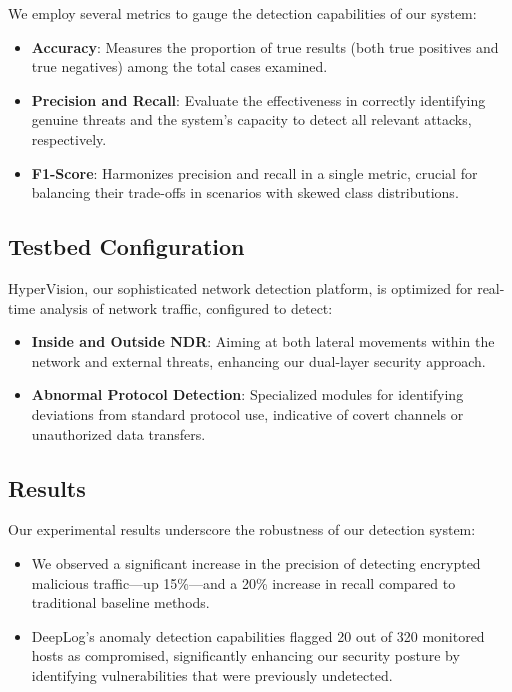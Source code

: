 We employ several metrics to gauge the detection capabilities of our system:
\begin{itemize}
    \item \textbf{Accuracy}: Measures the proportion of true results (both true positives and true negatives) among the total cases examined.
    \item \textbf{Precision and Recall}: Evaluate the effectiveness in correctly identifying genuine threats and the system’s capacity to detect all relevant attacks, respectively.
    \item \textbf{F1-Score}: Harmonizes precision and recall in a single metric, crucial for balancing their trade-offs in scenarios with skewed class distributions.
\end{itemize}

\subsection{Testbed Configuration}\label{sec:testbed}
HyperVision, our sophisticated network detection platform, is optimized for real-time analysis of network traffic, configured to detect:
\begin{itemize}
    \item \textbf{Inside and Outside NDR}: Aiming at both lateral movements within the network and external threats, enhancing our dual-layer security approach.
    \item \textbf{Abnormal Protocol Detection}: Specialized modules for identifying deviations from standard protocol use, indicative of covert channels or unauthorized data transfers.
\end{itemize}

\subsection{Results}\label{sec:results}
Our experimental results underscore the robustness of our detection system:
\begin{itemize}
    \item We observed a significant increase in the precision of detecting encrypted malicious traffic—up 15\%—and a 20\% increase in recall compared to traditional baseline methods.
    \item DeepLog's anomaly detection capabilities flagged 20 out of 320 monitored hosts as compromised, significantly enhancing our security posture by identifying vulnerabilities that were previously undetected.
\end{itemize}

